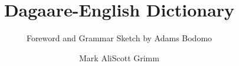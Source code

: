 \title{Dagaare-English Dictionary}
\subtitle{Foreword and Grammar Sketch by Adams Bodomo}
\author{Mark Ali\lastand Scott Grimm}%

\renewcommand{\lsISBNdigital}{000-0-000000-00-0}
\renewcommand{\lsISBNsoftcover}{000-0-000000-00-0}
\renewcommand{\lsISBNsoftcoverus}{000-0-000000-00-0}
\renewcommand{\lsSeries}{algad} %
\renewcommand{\lsSeriesNumber}{99} %
\renewcommand{\lsID}{000} %
